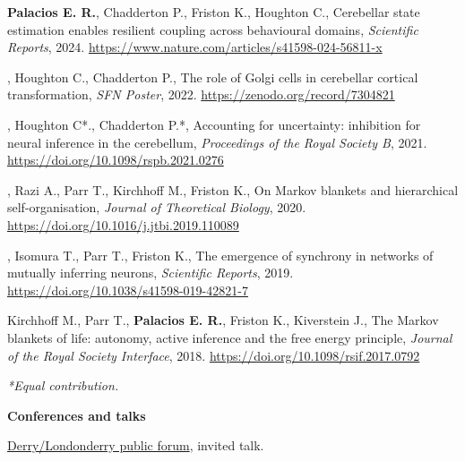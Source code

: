 \documentclass[11pt,usenames, dvipsnames]{article}
\begin{document}
 {\bfseries Palacios E. R.}, Chadderton P., Friston K., Houghton C.,
Cerebellar state estimation enables resilient coupling across behavioural domains,
\textit{Scientific Reports}, 2024. 
\url{https://www.nature.com/articles/s41598-024-56811-x}
\vspace{7pt}

, Houghton C., Chadderton P.,
The role of Golgi cells in cerebellar cortical transformation, 
\textit{SFN Poster}, 2022. 
\url{https://zenodo.org/record/7304821}
\vspace{7pt}

, Houghton C*., Chadderton P.*,
Accounting for uncertainty: inhibition for neural inference in the cerebellum,
\textit{Proceedings of the Royal Society B}, 2021. 
\url{https://doi.org/10.1098/rspb.2021.0276}
\vspace{7pt}

, Razi A., Parr T., Kirchhoff M., Friston K.,
On Markov blankets and hierarchical self-organisation,
\textit{Journal of Theoretical Biology}, 2020.
\url{https://doi.org/10.1016/j.jtbi.2019.110089}
\vspace{7pt}

, Isomura T., Parr T., Friston K.,
The emergence of synchrony in networks of mutually inferring neurons,
\textit{Scientific Reports}, 2019. 
\url{https://doi.org/10.1038/s41598-019-42821-7}
\vspace{7pt}

 Kirchhoff M., Parr T., {\bfseries Palacios E. R.}, Friston K., Kiverstein J.,
The Markov blankets of life: autonomy, active inference and the free energy principle,
\textit{Journal of the Royal Society Interface}, 2018.
\url{https://doi.org/10.1098/rsif.2017.0792}
\vspace{0.5cm}

\noindent\textit{*Equal contribution.}

\vspace{1.2cm}

{\large \bfseries \color{color_64493}
Conferences and talks}
\vspace{10pt}

\href{https://ai4ci.ac.uk/event/derrylondonderry-public-forum-ai-and-our-society/}{Derry/Londonderry public forum}, invited talk.

\vspace{7pt}
\end{document}

